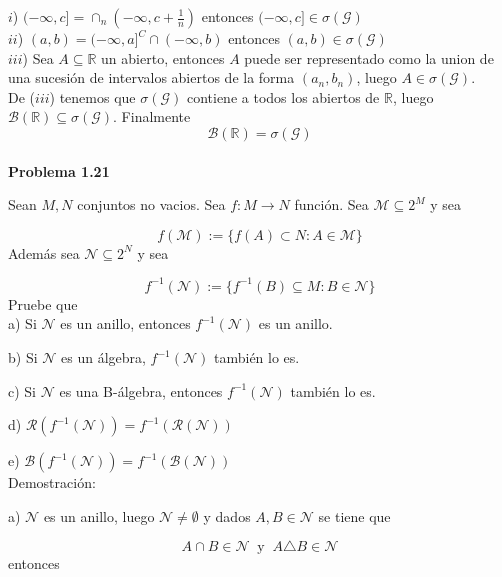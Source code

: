 \documentclass[12pt]{article}
\begin{document}
    $i$) $(-\infty,c] = \cap_n (-\infty,c+\frac{1}{n})$ entonces $(-\infty,c] \in \sigma(\mathcal{G})$
    \\

    $ii$) $(a,b) = (-\infty,a]^C\cap (-\infty,b)$ entonces $(a,b)\in \sigma(\mathcal{G})$
    \\

    $iii$) Sea $A\subseteq \mathbb{R}$ un abierto, entonces $A$ puede ser representado como 
    la union de una \hspace*{36pt} sucesi\'on de intervalos abiertos de la forma $(a_n,b_n)$, luego 
    $A\in \sigma(\mathcal{G})$. 
    \\

    De ($iii$) tenemos que $\sigma(\mathcal{G})$ contiene a todos los abiertos de 
    $\mathbb{R}$, luego $\mathscr{B}(\mathbb{R})\subseteq \sigma(\mathcal{G})$. Finalmente
    \[\mathscr{B}(\mathbb{R}) = \sigma(\mathcal{G})\]
    \\

    \textbf{Problema 1.21}

    Sean $M,N$ conjuntos no vacios. Sea $f:M \rightarrow N$ funci\'on. Sea 
    $\mathcal{M} \subseteq 2^M$ y sea 
    
    \[f(\mathcal{M}) := \{f(A)\subset N : A\in \mathcal{M}\}\]
    Adem\'as sea $\mathcal{N} \subseteq 2^N$ y sea 

    \[f^{-1}(\mathcal{N}) := \{f^{-1}(B)\subseteq M : B\in \mathcal{N}\}\]
    Pruebe que 
    \\

    a) Si $\mathcal{N}$ es un anillo, entonces $f^{-1}(\mathcal{N})$ es un anillo.
    
    b) Si $\mathcal{N}$ es un \'algebra, $f^{-1}(\mathcal{N})$ tambi\'en lo es.
    
    c) Si $\mathcal{N}$ es una B-\'algebra, entonces $f^{-1}(\mathcal{N})$ tambi\'en lo es.

    d) $\mathscr{R}(f^{-1}(\mathcal{N})) = f^{-1}(\mathscr{R}(\mathcal{N}))$ 

    e) $\mathscr{B}(f^{-1}(\mathcal{N})) = f^{-1}(\mathscr{B}(\mathcal{N}))$
    \\

    Demostraci\'on: 

    a) $\mathcal{N}$ es un anillo, luego $\mathcal{N} \neq \emptyset$ y dados 
    $A,B \in \mathcal{N}$ se tiene que 

    \[A\cap B\in \mathcal{N}\;\; \text{y}\;\; A\triangle B\in \mathcal{N}\]
    entonces 
    \\
\end{document}

